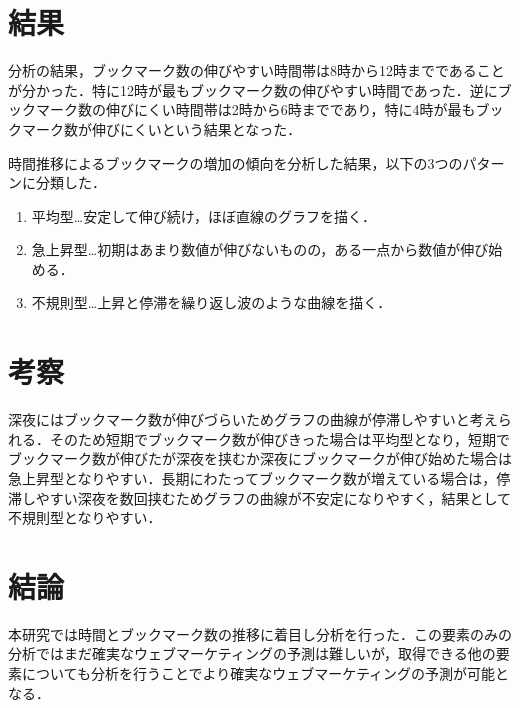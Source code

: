 \documentclass[uplatex,twocolumn,dvipdfmx]{jsarticle}
\begin{document}
\section{結果}
分析の結果，ブックマーク数の伸びやすい時間帯は8時から12時までであることが分かった．特に12時が最もブックマーク数の伸びやすい時間であった．逆にブックマーク数の伸びにくい時間帯は2時から6時までであり，特に4時が最もブックマーク数が伸びにくいという結果となった．\par
時間推移によるブックマークの増加の傾向を分析した結果，以下の3つのパターンに分類した．
\begin{enumerate}
\item 平均型…安定して伸び続け，ほぼ直線のグラフを描く．
\item 急上昇型…初期はあまり数値が伸びないものの，ある一点から数値が伸び始める．
\item 不規則型…上昇と停滞を繰り返し波のような曲線を描く． 
\end{enumerate}


\section{考察}
深夜にはブックマーク数が伸びづらいためグラフの曲線が停滞しやすいと考えられる．そのため短期でブックマーク数が伸びきった場合は平均型となり，短期でブックマーク数が伸びたが深夜を挟むか深夜にブックマークが伸び始めた場合は急上昇型となりやすい．長期にわたってブックマーク数が増えている場合は，停滞しやすい深夜を数回挟むためグラフの曲線が不安定になりやすく，結果として不規則型となりやすい．

\section{結論}
本研究では時間とブックマーク数の推移に着目し分析を行った．この要素のみの分析ではまだ確実なウェブマーケティングの予測は難しいが，取得できる他の要素についても分析を行うことでより確実なウェブマーケティングの予測が可能となる．



\end{document}
